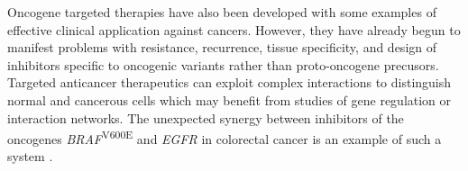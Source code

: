 
Oncogene targeted therapies have also been developed with some examples of effective clinical application against cancers. However, they have already begun to manifest problems with resistance, recurrence, tissue specificity, and design of inhibitors specific to oncogenic variants rather than proto-oncogene precusors. Targeted anticancer therapeutics can exploit complex interactions to distinguish normal and cancerous cells which may benefit from studies of gene regulation or interaction networks. The unexpected synergy between inhibitors of the oncogenes \textit{BRAF}\textsuperscript{V600E} and \textit{EGFR} in colorectal cancer is an example of such a system \citet{Prahallad2012}.



